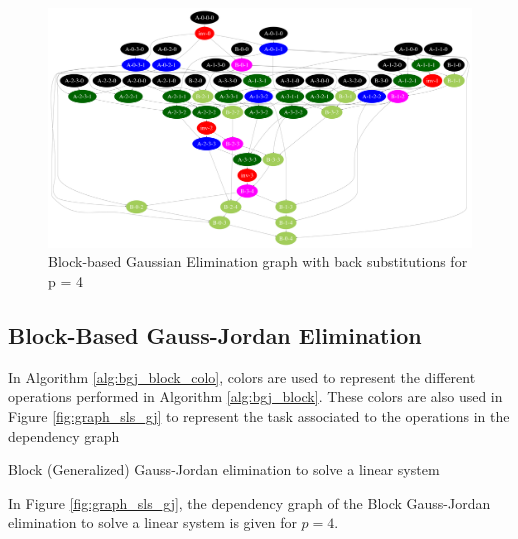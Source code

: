 \begin{figure}[h]
	\centering
	\includegraphics[width=\textwidth]{sls_g_graph_n4}
	\caption{Block-based Gaussian Elimination graph with back substitutions for p = 4\label{fig:graph_sls_g}}
\end{figure}

\subsection{Block-Based Gauss-Jordan Elimination}

In Algorithm \ref{alg:bgj_block_colo}, colors are used to represent the different operations performed in Algorithm \ref{alg:bgj_block}.
These colors are also used in Figure \ref{fig:graph_sls_gj} to represent the task associated to the operations in the dependency graph

\begin{algorithm}[h]
	\DontPrintSemicolon
	\caption{Block (Generalized) Gauss-Jordan elimination to solve a linear system \label{alg:bgj_block_colo} }
\end{algorithm}

In Figure \ref{fig:graph_sls_gj}, the dependency graph of the Block Gauss-Jordan elimination to solve a linear system is given for $p = 4$.

